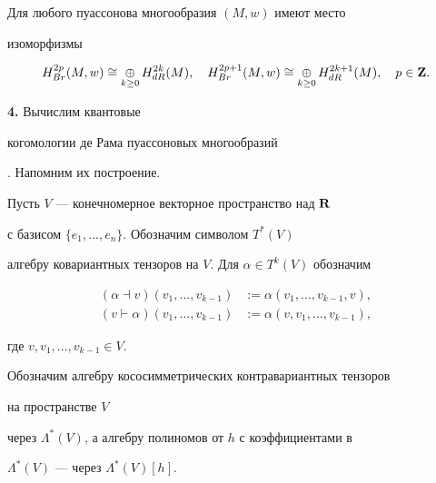 \begin{thms}


Для любого пуассонова многообразия $(M,w)$ имеют место


изоморфизмы


$$


H^{2p}_{Br}(M,w)\cong \mathop{\oplus}\limits_{k\ge 0}H^{2k}_{dR}(M), \quad


H^{2p+1}_{Br}(M,w)\cong \mathop{\oplus}\limits_{k\ge 0}H^{2k+1}_{dR}(M),\quad


p\in \bold Z.


$$


\end{thms}





\addtocounter{section}{1}


\setcounter{thms}{0}





{\bf 4.} Вычислим квантовые


когомологии де Рама пуассоновых многообразий


\cite{C-Zh}. Напомним их построение.





Пусть $V$ --- конечномерное векторное пространство над $\bold R$


с базисом $\{e_1, \dotsc, e_n\}$. Обозначим символом $T^*(V)$


алгебру ковариантных тензоров на $V$. Для $\alpha\in T^k (V)$ обозначим


\begin{align*}


(\alpha \dashv v)(v_1,\dotsc, v_{k-1}) &:=


\alpha(v_1,\dotsc,v_{k-1},v),\\


(v \vdash \alpha)(v_1,\dotsc,v_{k-1}) &:= \alpha(v,v_1,\dotsc,v_{k-1}), 


\end{align*}


где $v, v_1, \dotsc, v_{k-1} \in V$.


Обозначим алгебру кососимметрических контравариантных тензоров


на пространстве $V$


через $\Lambda^*(V)$, а алгебру полиномов от $h$ с коэффициентами в


$\Lambda^*(V)$ --- через $\Lambda^*(V)[h]$.


